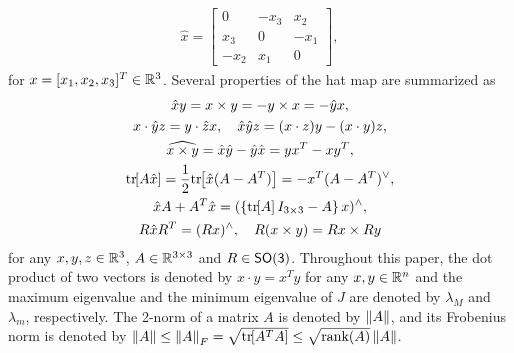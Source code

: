\begin{align*}
    \hat x = \begin{bmatrix} 0 & -x_3 & x_2 \\ x_3 & 0 & -x_1 \\ -x_2 & x_1 & 0\end{bmatrix},
\end{align*}
for $x=[x_1,x_2,x_3]^T\in\mathbb{R}^{3}$. 
Several properties of the hat map are summarized as
\begin{gather}
   \hat x y = x\times y = - y\times x = - \hat y x, \label{eqn:cross_product}\\
    x\cdot \hat y z = y\cdot \hat z x,\quad \hat x\hat y z = (x\cdot z) y - (x\cdot y ) z\label{eqn:STP},\\
    \widehat{x\times y} = \hat x \hat y -\hat y \hat x = yx^T-xy^T,\label{eqn:hatxy}\\
    \mathrm{tr}\negthickspace\left[ A\hat x  \right]=\frac{1}{2}\mathrm{tr}\negthickspace\left[ \hat x (A-A^T) \right]=-x^T (A-A^T)^\vee,\label{eqn:hat1}\\
    \hat x  A+A^T\hat x=(\left\{ \mathrm{tr}\negthickspace\left[ A \right]I_{3\times 3}-A \right\}x)^{\wedge}, \label{eqn:xAAx} \\
    R\hat x R^T = (Rx)^\wedge,\quad 
    R(x\times y) = Rx\times Ry\label{eqn:RxR}
\end{gather}
for any $x,y,z\in\mathbb{R}^{3}$, $A\in\mathbb{R}^{3\times 3}$ and $R\in\mathsf{SO(3)}$. 
Throughout this paper, the dot product of two vectors is denoted by $x\cdot y = x^T y$ for any $x,y\in\mathbb{R}^n$ and the maximum eigenvalue and the minimum eigenvalue of $J$ are denoted by $\lambda_M$ and $\lambda_m$, respectively. 
The 2-norm of a matrix \( A \) is denoted by \( \left\| A \right\| \), and its Frobenius norm is denoted by \( \left\| A \right\| \leq \left\| A \right\|_F = \sqrt{\mathrm{tr}\negthickspace\left[ A^T A \right]} \leq \sqrt{\text{rank}(A)} \left\| A \right\| \).

